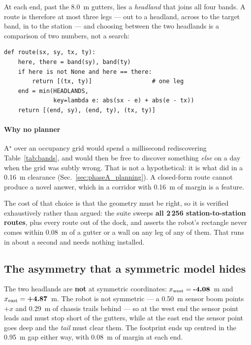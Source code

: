 At each end, past the \SI{8.0}{m} gutters, lies a \emph{headland} that
joins all four bands. A route is therefore at most three legs --- out to
a headland, across to the target band, in to the station --- and
choosing between the two headlands is a comparison of two numbers, not a
search:

\begin{lstlisting}[style=python]
def route(sx, sy, tx, ty):
    here, there = band(sy), band(ty)
    if here is not None and here == there:
        return [(tx, ty)]                 # one leg
    end = min(HEADLANDS,
              key=lambda e: abs(sx - e) + abs(e - tx))
    return [(end, sy), (end, ty), (tx, ty)]
\end{lstlisting}

\paragraph{Why no planner} A$^\star$ over an occupancy grid would spend
a millisecond rediscovering Table~\ref{tab:bands}, and would then be
free to discover something \emph{else} on a day when the grid was subtly
wrong. That is not a hypothetical: it is what \phaseA{} did in a
\SI{0.16}{m} clearance (Sec.~\ref{sec:phaseA_planning}). A closed-form
route cannot produce a novel answer, which in a corridor with
\SI{0.16}{m} of margin is a feature.

The cost of that choice is that the geometry must be right, so it is
verified exhaustively rather than argued: the suite sweeps
\textbf{all 2\,256 station-to-station routes}, plus every route out of
the dock, and asserts the robot's rectangle never comes within
\SI{0.08}{m} of a gutter or a wall on any leg of any of them. That runs
in about a second and needs nothing installed.

\subsection{The asymmetry that a symmetric model hides}

The two headlands are \textbf{not} at symmetric coordinates:
$x_{\text{west}} = \textbf{-4.08}$~m and
$x_{\text{east}} = \textbf{+4.87}$~m. The robot is not symmetric --- a
\SI{0.50}{m} sensor boom points $+x$ and \SI{0.29}{m} of chassis trails
behind --- so at the west end the sensor point leads and must stop short
of the gutters, while at the east end the sensor point goes deep and the
\emph{tail} must clear them. The footprint ends up centred in the
\SI{0.95}{m} gap either way, with \SI{0.08}{m} of margin at each end.


